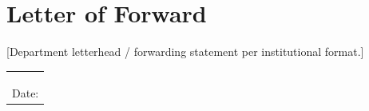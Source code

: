 \chapter*{Letter of Forward}

[Department letterhead / forwarding statement per institutional format.] %

\vspace{2cm}
\noindent
\begin{tabular}{@{}l}
\hrulefill \\
[HEAD OF DEPARTMENT NAME] \\ %
[TITLE] \\ %
Date: \underline{\hspace{4cm}}
\end{tabular}
